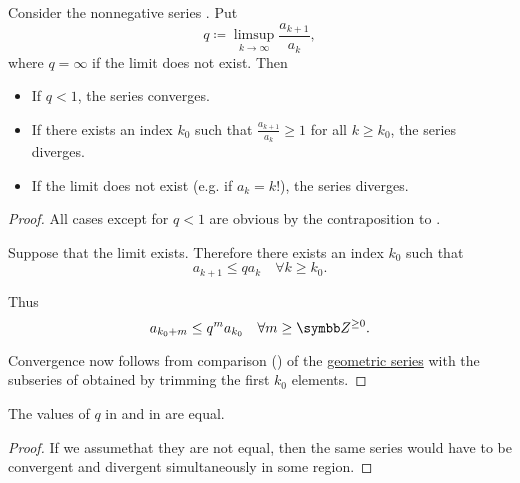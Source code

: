 \begin{proposition}\label{thm:dalamberts_ratio_test}
  Consider the nonnegative series . Put
  \begin{equation*}
    q \coloneqq \limsup_{k \to \infty} \frac {a_{k+1}} {a_k},
  \end{equation*}
  where \( q = \infty \) if the limit does not exist. Then
  \begin{itemize}
    \item If \( q < 1 \), the series converges.
    \item If there exists an index \( k_0 \) such that \( \frac {a_{k+1}} {a_k} \geq 1 \) for all \( k \geq k_0 \), the series diverges.
    \item If the limit does not exist (e.g. if \( a_k = k! \)), the series diverges.
  \end{itemize}
\end{proposition}
\begin{proof}
  All cases except for \( q < 1 \) are obvious by the contraposition to .

  Suppose that the limit exists. Therefore there exists an index \( k_0 \) such that
  \begin{equation*}
    a_{k+1} \leq q a_k \quad\forall k \geq k_0.
  \end{equation*}

  Thus
  \begin{equation*}
    a_{k_0 + m} \leq q^m a_{k_0} \quad\forall m \geq \BZ^{\geq 0}.
  \end{equation*}

  Convergence now follows from comparison () of the \hyperref[def:geometric_progression/series]{geometric series} with the subseries of  obtained by trimming the first \( k_0 \) elements.
\end{proof}

\begin{proposition}\label{remark:nonnegative_series_convergence_test_equivalence}
  The values of \( q \) in  and in  are equal.
\end{proposition}
\begin{proof}
  If we assume\LEM that they are not equal, then the same series would have to be convergent and divergent simultaneously in some region.
\end{proof}

